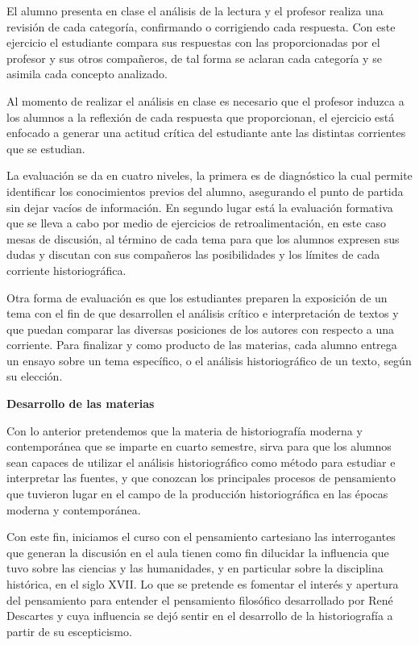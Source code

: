 \enlargethispage{1\baselineskip}
El alumno presenta en clase el análisis de la lectura y el profesor 
realiza una revisión de cada categoría, confirmando o corrigiendo cada 
respuesta. Con este ejercicio el estudiante compara sus respuestas con 
las proporcionadas por el profesor y sus otros compañeros, de tal forma 
se aclaran cada categoría y se asimila cada concepto analizado.

Al momento de realizar el análisis en clase es necesario que el 
profesor induzca a los alumnos a la reflexión de cada respuesta que 
proporcionan, el ejercicio está enfocado a generar una actitud crítica 
del estudiante ante las distintas corrientes que se estudian.

La evaluación se da en cuatro niveles, la primera es de diagnóstico la 
cual permite identificar los conocimientos previos del alumno, 
asegurando el punto de partida sin dejar vacíos de información. En 
segundo lugar está la evaluación formativa que se lleva a cabo por 
medio de ejercicios de retroalimentación, en este caso mesas de 
discusión, al término de cada tema para que los alumnos expresen sus 
dudas y discutan con sus compañeros las posibilidades y los límites de 
cada corriente historiográfica.

Otra forma de evaluación es que los estudiantes preparen la exposición 
de un tema con el fin de que desarrollen el análisis crítico e 
interpretación de textos y que puedan comparar las diversas posiciones 
de los autores con respecto a una corriente. Para finalizar y como 
producto de las materias, cada alumno entrega un ensayo sobre un tema 
específico, o el análisis historiográfico de un texto, según su 
elección.


\textbf{Desarrollo de las materias}

Con lo anterior pretendemos que la materia de historiografía moderna y 
contemporánea que se imparte en cuarto semestre, sirva para que los 
alumnos sean capaces de utilizar el análisis historiográfico como 
método para estudiar e interpretar las fuentes, y que conozcan los 
principales procesos de pensamiento que tuvieron lugar en el campo de 
la producción historiográfica en las épocas moderna y contemporánea.

\enlargethispage{1\baselineskip}
Con este fin, iniciamos el curso con el pensamiento cartesiano las 
interrogantes que generan la discusión en el aula tienen como fin 
dilucidar la influencia que tuvo sobre las ciencias y las humanidades, 
y en particular sobre la disciplina histórica, en el siglo XVII\@. Lo que 
se pretende es fomentar el interés y apertura del pensamiento para 
entender el pensamiento filosófico desarrollado por René Descartes y 
cuya influencia se dejó sentir en el desarrollo de la historiografía a 
partir de su escepticismo. 


